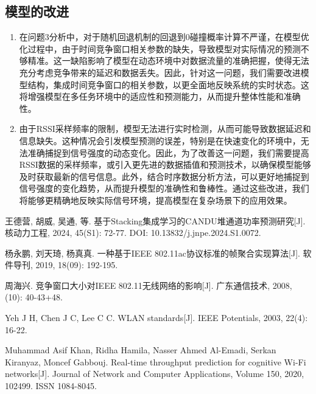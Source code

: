 \documentclass[bwprint]{gmcmthesis}
\begin{document}
\subsection{模型的改进}

\begin{enumerate}
	\item 在问题3分析中，对于随机回退机制的回退到0碰撞概率计算不严谨，在模型优化过程中，由于时间竞争窗口相关参数的缺失，导致模型对实际情况的预测不够精准。这一缺陷影响了模型在动态环境中对数据流量的准确把握，使得无法充分考虑竞争带来的延迟和数据丢失。因此，针对这一问题，我们需要改进模型结构，集成时间竞争窗口的相关参数，以更全面地反映系统的实时状态。这将增强模型在多任务环境中的适应性和预测能力，从而提升整体性能和准确性。
	
	\item 由于RSSI采样频率的限制，模型无法进行实时检测，从而可能导致数据延迟和信息缺失。这种情况会引发模型预测的误差，特别是在快速变化的环境中，无法准确捕捉到信号强度的动态变化。因此，为了改善这一问题，我们需要提高RSSI数据的采样频率，或引入更先进的数据插值和预测技术，以确保模型能够及时获取最新的信号信息。此外，结合时序数据分析方法，可以更好地捕捉到信号强度的变化趋势，从而提升模型的准确性和鲁棒性。通过这些改进，我们将能够更精确地反映实际信号环境，提高模型在复杂场景下的应用效果。
\end{enumerate}



\newpage

\begin{thebibliography}{9}
	
	王德营, 胡威, 吴通, 等. 基于Stacking集成学习的CANDU堆通道功率预测研究[J]. 核动力工程, 2024, 45(S1): 72-77. DOI: 10.13832/j.jnpe.2024.S1.0072.
	
	杨永鹏, 刘天琦, 杨真真. 一种基于IEEE 802.11ac协议标准的帧聚合实现算法[J]. 软件导刊, 2019, 18(09): 192-195.
	
	周海兴. 竞争窗口大小对IEEE 802.11无线网络的影响[J]. 广东通信技术, 2008, (10): 40-43+48.
	
	Yeh J H, Chen J C, Lee C C. WLAN standards[J]. IEEE Potentials, 2003, 22(4): 16-22.
	
	Muhammad Asif Khan, Ridha Hamila, Nasser Ahmed Al-Emadi, Serkan Kiranyaz, Moncef Gabbouj. Real-time throughput prediction for cognitive Wi-Fi networks[J]. Journal of Network and Computer Applications, Volume 150, 2020, 102499. ISSN 1084-8045.
	
\end{thebibliography}
\end{document}
